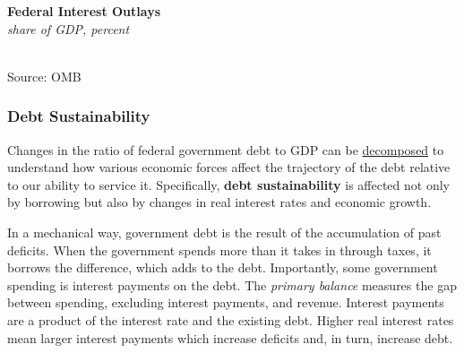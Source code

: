 \documentclass{report}
\makeatletter
\newcommand{\tbllink}[1]{\href{https://raw.githubusercontent.com/bdecon/US-chartbook/master/chartbook/data/#1}{\faTable}}
\newcommand*\short[1]{\expandafter\@gobbletwo\number\numexpr#1\relax}
\newcommand{\shdateaxisticks}{
		date coordinates in=x, axis line style={draw=none},
		xmax={2024-01-31},
		max space between ticks=40,	    
		xtick={{1990-01-01}, {1995-01-01}, {2000-01-01}, 
			{2005-01-01}, {2010-01-01}, {2015-01-01}, {2020-01-01}},
		minor xtick={},
		enlarge y limits={0.06}, enlarge x limits={0.01},
		xticklabel style={align=center, yshift=-2pt}, tick label style={inner sep=0pt},
		}
\newcommand{\bbar}[2]{extra #1 ticks = {{#2}}, extra #1 tick labels = ,
		extra #1 tick style = {grid=major, grid style={thick, black!25}},}
\newcommand{\thickline}[4]{\addplot[ultra thick, no markers, color=#1] 
		table [x=#2, y=#3, col sep=comma] {#4};	}
\newcommand{\rbars}{
		\fill[color=black!10] (axis cs:{1990-07-01},\pgfkeysvalueof{/pgfplots/ymin})
			rectangle (axis cs:{1991-03-01}, \pgfkeysvalueof{/pgfplots/ymax});
		\fill[color=black!10] (axis cs:{2007-12-01},\pgfkeysvalueof{/pgfplots/ymin})
			rectangle (axis cs:{2009-07-01}, \pgfkeysvalueof{/pgfplots/ymax});
		\fill[color=black!10] (axis cs:{2001-03-01},\pgfkeysvalueof{/pgfplots/ymin})
			rectangle (axis cs:{2001-11-01}, \pgfkeysvalueof{/pgfplots/ymax});
		\fill[color=black!10] (axis cs:{2020-02-01},\pgfkeysvalueof{/pgfplots/ymin})
			rectangle (axis cs:{2020-05-01}, \pgfkeysvalueof{/pgfplots/ymax});}
\makeatother
\begin{document}
{\begin{minipage}{0.36\textwidth}
\small 
\end{minipage} \hspace{6mm} \begin{minipage}{0.36\textwidth}
\normalsize \textbf{Federal Interest Outlays}\\
\footnotesize{\textit{share of GDP, percent}}\\
\hspace*{-2mm} \\
\footnotesize{Source: OMB%
} \hfill \tbllink{fedintexp.csv}
\end{minipage} 
\newpage
\begin{minipage}{1.0\textwidth}   
\subsubsection*{Debt Sustainability}
\small Changes in the ratio of federal government debt to GDP can be \href{https://www.imf.org/en/Publications/TNM/Issues/2016/12/31/A-Practical-Guide-to-Public-Debt-Dynamics-Fiscal-Sustainability-and-Cyclical-Adjustment-of-23498}{decomposed} to understand how various economic forces affect the trajectory of the debt relative to our ability to service it. Specifically, \textbf{debt sustainability} is affected not only by borrowing but also by changes in real interest rates and economic growth. 

In a mechanical way, government debt is the result of the accumulation of past deficits. When the government spends more than it takes in through taxes, it borrows the difference, which adds to the debt. Importantly, some government spending is interest payments on the debt. The \textit{primary balance} measures the gap between spending, excluding interest payments, and revenue. Interest payments are a product of the interest rate and the existing debt. Higher real interest rates mean larger interest payments which increase deficits and, in turn, increase debt.


\end{minipage}}
\end{document}
